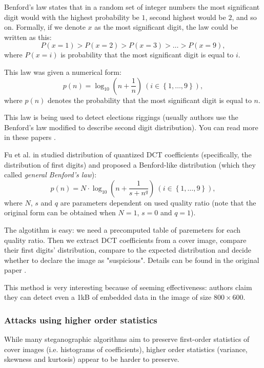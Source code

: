 Benford's law states that in a random set of integer numbers the most significant digit would
with the highest probability be $1$, second highest would be $2$, and so on. Formally, if we denote $x$
as the most significant digit, the law could be written as this:
$$P(x = 1) > P(x = 2) > P(x = 3) > \ldots > P(x = 9),$$
where $P(x = i)$ is probability that the most significant digit is equal to $i$.

This law was given a numerical form:
$$p(n) = \log_{10}\left(n + \frac{1}{n}\right) ~\left(i \in \left\{ 1, \ldots , 9 \right\}\right),$$
where $p(n)$ denotes the probability that the most significant digit is equal to $n$.

This law is being used to detect elections riggings (usually authors use the Benford's law modified to 
describe second digit distribution). You can read more in these papers
\cite{mebane2006election, roukema2009benford, deckert2011benford}.

Fu et al. in \cite{fu2007generalized} studied distribution of quantized DCT coefficients (specifically, the distribution of first digits)
and proposed a Benford-like distribution (which they called \emph{general Benford's law}):
$$p(n) = N \cdot \log_{10}\left(n + \frac{1}{s + n^q}\right) ~\left(i \in \left\{ 1, \ldots , 9 \right\}\right), $$
where $N$, $s$ and $q$ are parameters dependent on used quality ratio (note that the original form can be obtained when
$N = 1$, $s = 0$ and $q = 1$).

The algotithm is easy: we need a precomputed table of paremeters for each quality ratio. Then we extract DCT coefficients
from a cover image, compare their first digits' distribution, compare to the expected distribution and decide whether to
declare the image as "suspicious". Details can be found in the original paper \cite{andriotis2013two}.

This method is very interesting because of seeming effectiveness: authors claim they can detect even a 1kB of embedded data
in the image of size $800 \times 600$.

\subsubsection{Attacks using higher order statistics}

While many steganographic algorithms aim to preserve first-order statistics of cover images
(i.e. histograms of coefficients), higher order statistics (variance, skewness and kurtosis)
appear to be harder to preserve.

